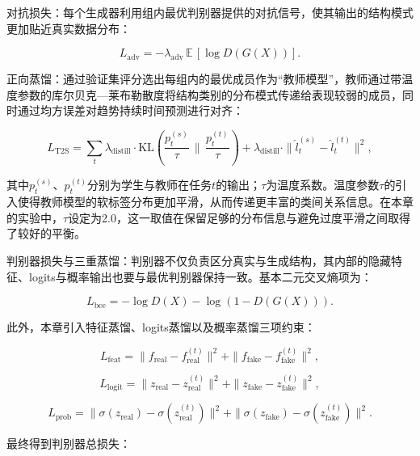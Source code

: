 对抗损失：每个生成器利用组内最优判别器提供的对抗信号，使其输出的结构模式更加贴近真实数据分布：

\begin{equation}
L_{\text{adv}}
=
-\lambda_{\text{adv}}\,\mathbb{E}\,[\log D(G(X))].
\end{equation}

正向蒸馏：通过验证集评分选出每组内的最优成员作为``教师模型''，教师通过带温度参数的库尔贝克—莱布勒散度将结构类别的分布模式传递给表现较弱的成员，同时通过均方误差对趋势持续时间预测进行对齐：

\begin{equation}
L_{\text{T2S}}
=
\sum_{t}
\lambda_{\text{distill}}
\cdot
\mathrm{KL}\!
\left(
\frac{p^{(s)}_t}{\tau}
\,\Big\|\,
\frac{p^{(t)}_t}{\tau}
\right)
+
\lambda_{\text{distill}}
\cdot
\|\hat{l}^{(s)}_t - \hat{l}^{(t)}_t\|^2,
\end{equation}

其中$p^{(s)}_t$、$p^{(t)}_t$分别为学生与教师在任务$t$的输出；$\tau$为温度系数。温度参数$\tau$的引入使得教师模型的软标签分布更加平滑，从而传递更丰富的类间关系信息。在本章的实验中，$\tau$设定为2.0，这一取值在保留足够的分布信息与避免过度平滑之间取得了较好的平衡。

判别器损失与三重蒸馏：判别器不仅负责区分真实与生成结构，其内部的隐藏特征、logits与概率输出也要与最优判别器保持一致。基本二元交叉熵项为：

\begin{equation}
L_{\text{bce}}
=
-\log D(X)
-
\log(1-D(G(X))).
\end{equation}

此外，本章引入特征蒸馏、logits蒸馏以及概率蒸馏三项约束：

\begin{equation}
L_{\text{feat}} =
\|f_{\text{real}} - f^{(t)}_{\text{real}}\|^2
+
\|f_{\text{fake}} - f^{(t)}_{\text{fake}}\|^2,
\end{equation}

\begin{equation}
L_{\text{logit}} =
\|z_{\text{real}} - z^{(t)}_{\text{real}}\|^2
+
\|z_{\text{fake}} - z^{(t)}_{\text{fake}}\|^2,
\end{equation}

\begin{equation}
L_{\text{prob}}
=
\|\sigma(z_{\text{real}}) - \sigma(z^{(t)}_{\text{real}})\|^2
+
\|\sigma(z_{\text{fake}}) - \sigma(z^{(t)}_{\text{fake}})\|^2.
\end{equation}

最终得到判别器总损失：

